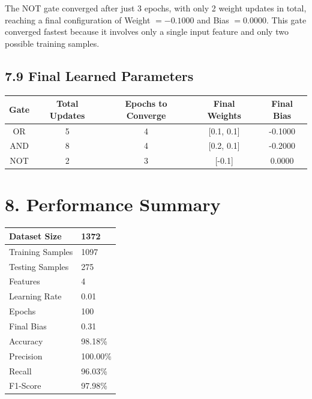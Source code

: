 \documentclass[11pt,a4paper]{article}
\begin{document}
\vspace{0.15cm}

The NOT gate converged after just 3 epochs, with only 2 weight updates in total, reaching a final configuration of Weight $= -0.1000$ and Bias $= 0.0000$. This gate converged fastest because it involves only a single input feature and only two possible training samples.


\subsection*{7.9 Final Learned Parameters}

\begin{center}
\begin{tabular}{|c|c|c|c|c|}
\hline
\textbf{Gate} & \textbf{Total Updates} & \textbf{Epochs to Converge} & \textbf{Final Weights} & \textbf{Final Bias}\\
\hline
OR & 5 & 4 & [0.1, 0.1] & -0.1000\\
\hline
AND & 8 & 4 & [0.2, 0.1] & -0.2000\\
\hline
NOT & 2 & 3 & [-0.1] & 0.0000\\
\hline
\end{tabular}
\end{center}
\section*{8. Performance Summary}

\begin{center}
\begin{tabular}{|p{7cm}|p{5cm}|}
\hline
Dataset Size & 1372\\
\hline
Training Samples & 1097\\
\hline
Testing Samples & 275\\
\hline
Features & 4\\
\hline
Learning Rate & 0.01\\
\hline
Epochs & 100\\
\hline
Final Bias & 0.31\\
\hline
Accuracy & 98.18\%\\
\hline
Precision & 100.00\%\\
\hline
Recall & 96.03\%\\
\hline
F1-Score & 97.98\%\\
\hline
\end{tabular}
\end{center}


\end{document}

